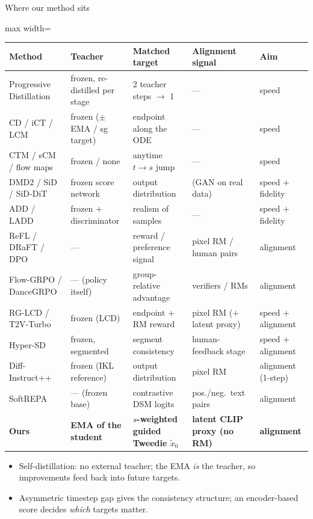 \documentclass[aspectratio=169,10pt]{beamer}
\newcommand{\xtil}{\tilde{x}_0}
\begin{document}
\begin{frame}{Where our method sits}
  \begin{center}
  \begin{adjustbox}{max width=\textwidth}
  \scriptsize
  \begin{tabular}{@{}lllll@{}}
    \toprule
    \textbf{Method} & \textbf{Teacher} & \textbf{Matched target} & \textbf{Alignment signal} & \textbf{Aim} \\
    \midrule
    Progressive Distillation & frozen, re-distilled per stage & 2 teacher steps $\to$ 1 & --- & speed \\
    CD / iCT / LCM & frozen ($\pm$ EMA / sg target) & endpoint along the ODE & --- & speed \\
    CTM / sCM / flow maps & frozen / none & anytime $t \to s$ jump & --- & speed \\
    DMD2 / SiD / SiD-DiT & frozen score network & output distribution & (GAN on real data) & speed $+$ fidelity \\
    ADD / LADD & frozen $+$ discriminator & realism of samples & --- & speed $+$ fidelity \\
    ReFL / DRaFT / DPO & --- & reward / preference signal & pixel RM / human pairs & alignment \\
    Flow-GRPO / DanceGRPO & --- (policy itself) & group-relative advantage & verifiers / RMs & alignment \\
    RG-LCD / T2V-Turbo & frozen (LCD) & endpoint $+$ RM reward & pixel RM ($+$ latent proxy) & speed $+$ alignment \\
    Hyper-SD & frozen, segmented & segment consistency & human-feedback stage & speed $+$ alignment \\
    Diff-Instruct++ & frozen (IKL reference) & output distribution & pixel RM & alignment (1-step) \\
    SoftREPA & --- (frozen base) & contrastive DSM logits & pos./neg.\ text pairs & alignment \\
    \midrule
    \textbf{Ours} & \textbf{EMA of the student} &
      \textbf{$s$-weighted guided Tweedie $\xtil$} &
      \textbf{latent CLIP proxy (no RM)} & \textbf{alignment} \\
    \bottomrule
  \end{tabular}
  \end{adjustbox}
  \end{center}
  \vspace{0.5em}
  \begin{itemize}
    \item Self-distillation: no external teacher; the EMA \emph{is} the
      teacher, so improvements feed back into future targets.
    \item Asymmetric timestep gap gives the consistency structure; an
      encoder-based score decides \emph{which} targets matter.
  \end{itemize}
\end{frame}
\end{document}
